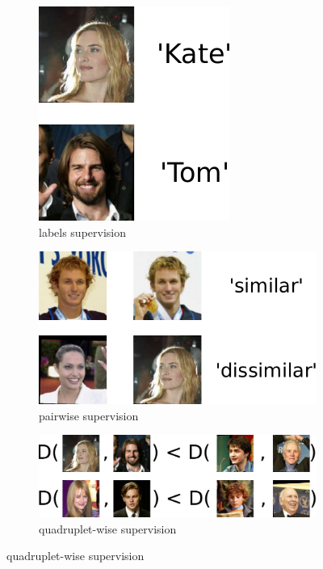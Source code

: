 \documentclass[twoside,11pt]{article}
\begin{document}
\begin{figure}[ht]
    \centering
    \begin{subfigure}[t]{0.25\textwidth} %
        \centering \includegraphics[scale=0.45]{labels.pdf}
        \caption{labels supervision}\label{fig:full}
    \end{subfigure}
    \begin{subfigure}[t]{0.25\textwidth}
        \centering \includegraphics[scale=0.45]{pairs.pdf}
        \caption{pairwise supervision}\label{fig:pairs}
    \end{subfigure}
    \begin{subfigure}[t]{0.40\textwidth}
        \centering \includegraphics[scale=0.45]{quadruplets.pdf}
        \caption{quadruplet-wise supervision}\label{fig:quadruplets}

\end{subfigure}
\end{figure}
\end{document}
